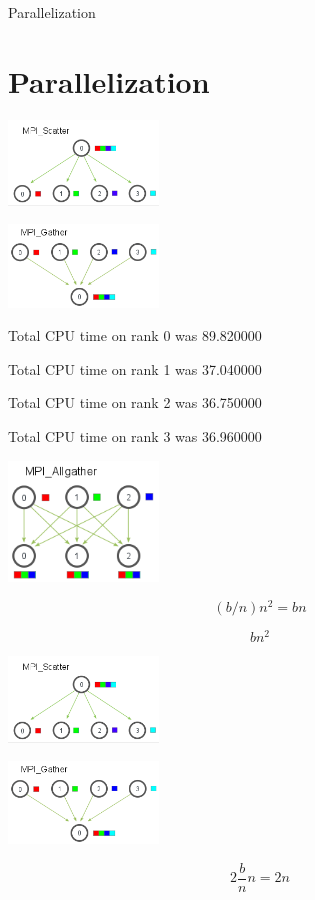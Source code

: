 \documentclass{beamer}
\begin{document}
\begin{frame}[allowframebreaks]{Parallelization}
\section{Parallelization}


\includegraphics[width=4cm]{mpi_scatter}

\framebreak



\includegraphics[width=4cm]{mpi_gather}

\framebreak

Total CPU time on rank 0 was 89.820000

Total CPU time on rank 1 was 37.040000

Total CPU time on rank 2 was 36.750000

Total CPU time on rank 3 was 36.960000

\framebreak

\includegraphics[width=4cm]{mpi_allgather}


\[
  (b/n)n^2 = bn
\]

\[
  bn^2  
\]

\framebreak

\includegraphics[width=4cm]{mpi_scatter}

\includegraphics[width=4cm]{mpi_gather}


\[
  2\dfrac{b}{n}n = 2n
\]


\end{frame}
\end{document}
